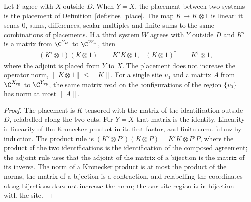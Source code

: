 \begin{lemma}
    \label{lem:sites_place_between_algebra}
    \leanok
    Let $Y$ agree with $X$ outside $D$. When $Y=X$, the placement between two
    systems is the placement of Definition~\ref{def:sites_place}. The map
    $K\mapsto K\otimes1$ is linear: it sends $0$, sums, differences, scalar
    multiples and finite sums to the same combinations of placements. If
    a third system $W$ agrees with $Y$ outside $D$ and $K'$ is a matrix from
    $\C^{Y_D}$ to $\C^{W_D}$, then
    \begin{align*}
        (K'\otimes1)(K\otimes1) & =K'K\otimes1,       &
        (K\otimes1)^\dagger     & =K^\dagger\otimes1,
    \end{align*}
    where the adjoint is placed from $Y$ to $X$. The placement does not increase
    the operator norm, $\lVert K\otimes1\rVert\le\lVert K\rVert$. For a single site
    $v_0$ and a matrix $A$ from $\C^{X_{v_0}}$ to $\C^{Y_{v_0}}$, the same matrix
    read on the configurations of the region $\{v_0\}$ has norm at most
    $\lVert A\rVert$.
\end{lemma}
\begin{proof}\leanok
    The placement is $K$ tensored with the matrix of the identification outside $D$,
    relabelled along the two cuts. For $Y=X$ that matrix is the identity. Linearity
    is linearity of the Kronecker product in its first factor, and finite sums follow
    by induction. The product rule is $(K'\otimes P')(K\otimes P)=K'K\otimes P'P$,
    where the product of the two identifications is the identification of the
    composed agreement; the adjoint rule uses that the adjoint of the matrix of a
    bijection is the matrix of its inverse. The norm of a Kronecker product is at
    most the product of the norms, the matrix of a bijection is a contraction, and
    relabelling the coordinates along bijections does not increase the norm; the
    one-site region is in bijection with the site.
\end{proof}


